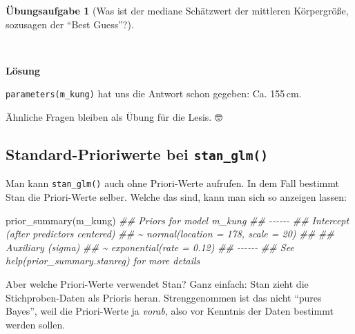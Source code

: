 \documentclass[
  ngerman,
  letterpaper,
  twoside,
  open=any]{scrbook}
\newenvironment{Shaded}{\begin{snugshade}}{\end{snugshade}}
\newcommand{\DocumentationTok}[1]{\textcolor[rgb]{0.37,0.37,0.37}{\textit{#1}}}
\newcommand{\FunctionTok}[1]{\textcolor[rgb]{0.28,0.35,0.67}{#1}}
\newcommand{\NormalTok}[1]{\textcolor[rgb]{0.00,0.23,0.31}{#1}}
\theoremstyle{definition}
\theoremstyle{plain}
\theoremstyle{definition}
\newtheorem{exercise}{Übungsaufgabe}[chapter]
\theoremstyle{definition}
\theoremstyle{definition}
\theoremstyle{definition}
\newtheorem{exercise}{Übungsaufgabe}[chapter]
\theoremstyle{remark}
\begin{document}
\begin{exercise}[Was ist der mediane Schätzwert der mittleren
Körpergröße, sozusagen der \enquote{Best
Guess}?]\protect\hypertarget{exr-kung6}{}\label{exr-kung6}

~

\begin{tcolorbox}[enhanced jigsaw, arc=.35mm, bottomrule=.15mm, breakable, colback=white, colframe=quarto-callout-tip-color-frame, left=2mm, leftrule=.75mm, opacityback=0, rightrule=.15mm, toprule=.15mm]

\vspace{-3mm}\textbf{Lösung}\vspace{3mm}

\texttt{parameters(m\_kung)} hat uns die Antwort schon gegeben: Ca.
155\,cm.

\end{tcolorbox}

\end{exercise}

Ähnliche Fragen bleiben als Übung für die Lesis. 🤓

\subsection{\texorpdfstring{Standard-Prioriwerte bei
\texttt{stan\_glm()}}{Standard-Prioriwerte bei stan\_glm()}}\label{standard-prioriwerte-bei-stan_glm}

Man kann \texttt{stan\_glm()} auch ohne Priori-Werte aufrufen. In dem
Fall bestimmt Stan die Priori-Werte selber. Welche das sind, kann man
sich so anzeigen lassen:

\begin{Shaded}
\begin{Highlighting}[]
\FunctionTok{prior\_summary}\NormalTok{(m\_kung)}
\DocumentationTok{\#\# Priors for model \textquotesingle{}m\_kung\textquotesingle{} }
\DocumentationTok{\#\# {-}{-}{-}{-}{-}{-}}
\DocumentationTok{\#\# Intercept (after predictors centered)}
\DocumentationTok{\#\#  \textasciitilde{} normal(location = 178, scale = 20)}
\DocumentationTok{\#\# }
\DocumentationTok{\#\# Auxiliary (sigma)}
\DocumentationTok{\#\#  \textasciitilde{} exponential(rate = 0.12)}
\DocumentationTok{\#\# {-}{-}{-}{-}{-}{-}}
\DocumentationTok{\#\# See help(\textquotesingle{}prior\_summary.stanreg\textquotesingle{}) for more details}
\end{Highlighting}
\end{Shaded}

Aber welche Priori-Werte verwendet Stan? Ganz einfach: Stan zieht die
Stichproben-Daten als Prioris heran. Strenggenommen ist das nicht
\enquote{pures Bayes}, weil die Priori-Werte ja \emph{vorab}, also vor
Kenntnis der Daten bestimmt werden sollen.
\end{document}

